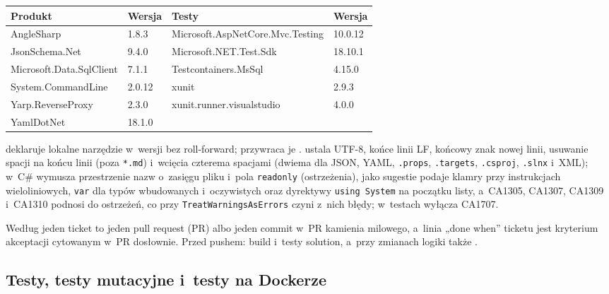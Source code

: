 {\small
\begin{tabularx}{\linewidth}{@{}l l >{\raggedright\arraybackslash}X l@{}}
\toprule
Produkt & Wersja & Testy & Wersja \\
\midrule
AngleSharp & 1.8.3 & Microsoft.AspNetCore.Mvc.Testing & 10.0.12 \\
JsonSchema.Net & 9.4.0 & Microsoft.NET.Test.Sdk & 18.10.1 \\
Microsoft.Data.SqlClient & 7.1.1 & Testcontainers.MsSql & 4.15.0 \\
System.CommandLine & 2.0.12 & xunit & 2.9.3 \\
Yarp.ReverseProxy & 2.3.0 & xunit.runner.visualstudio & 4.0.0 \\
YamlDotNet & 18.1.0 & & \\
\bottomrule
\end{tabularx}
}

 deklaruje lokalne narzędzie  w~wersji  bez roll-forward; przywraca je .
 ustala UTF-8, końce linii LF, końcowy znak nowej linii, usuwanie
spacji na końcu linii (poza \texttt{*.md}) i~wcięcia czterema spacjami (dwiema dla JSON,
YAML, \texttt{.props}, \texttt{.targets}, \texttt{.csproj}, \texttt{.slnx} i~XML); w~C\#
wymusza przestrzenie nazw o~zasięgu pliku i~pola \texttt{readonly} (ostrzeżenia), jako
sugestie podaje klamry przy instrukcjach wieloliniowych, \texttt{var} dla typów
wbudowanych i~oczywistych oraz dyrektywy \texttt{using System} na początku listy,
a~CA1305, CA1307, CA1309 i~CA1310 podnosi do ostrzeżeń, co przy
\texttt{TreatWarningsAsErrors} czyni z~nich błędy; w~testach wyłącza CA1707.

Według  jeden ticket to jeden pull request (PR) albo jeden commit w~PR
kamienia milowego, a~linia „done when” ticketu jest kryterium akceptacji cytowanym w~PR
dosłownie. Przed pushem: build i~testy solution, a~przy zmianach logiki także
.


\subsection{Testy, testy mutacyjne i~testy na Dockerze}\label{sec:rdzen-testy}

